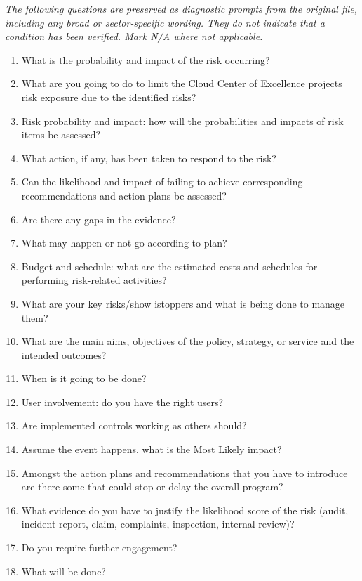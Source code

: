 \documentclass[10pt,letterpaper]{article}
\newcommand{\docsection}[1]{\par\Needspace{5\baselineskip}\vspace{8pt}{\large\sffamily\bfseries\color{navy}#1}\par\vspace{2pt}{\color{rulegrey}\rule{\linewidth}{.6pt}}\par}
\begin{document}
\docsection{03 \quad Source diagnostic checklist}
\textit{The following questions are preserved as diagnostic prompts from the original file, including any broad or sector-specific wording. They do not indicate that a condition has been verified. Mark N/A where not applicable.}
\begingroup\small\begin{enumerate}[leftmargin=2.1em, itemsep=4pt]
\item[1.] What is the probability and impact of the risk occurring?
\item[2.] What are you going to do to limit the Cloud Center of Excellence projects risk exposure due to the identified risks?
\item[3.] Risk probability and impact: how will the probabilities and impacts of risk items be assessed?
\item[4.] What action, if any, has been taken to respond to the risk?
\item[5.] Can the likelihood and impact of failing to achieve corresponding recommendations and action plans be assessed?
\item[6.] Are there any gaps in the evidence?
\item[7.] What may happen or not go according to plan?
\item[8.] Budget and schedule: what are the estimated costs and schedules for performing risk-related activities?
\item[9.] What are your key risks/show istoppers and what is being done to manage them?
\item[10.] What are the main aims, objectives of the policy, strategy, or service and the intended outcomes?
\item[11.] When is it going to be done?
\item[12.] User involvement: do you have the right users?
\item[13.] Are implemented controls working as others should?
\item[14.] Assume the event happens, what is the Most Likely impact?
\item[15.] Amongst the action plans and recommendations that you have to introduce are there some that could stop or delay the overall program?
\item[16.] What evidence do you have to justify the likelihood score of the risk (audit, incident report, claim, complaints, inspection, internal review)?
\item[17.] Do you require further engagement?
\item[18.] What will be done?

\end{enumerate}
\end{document}
